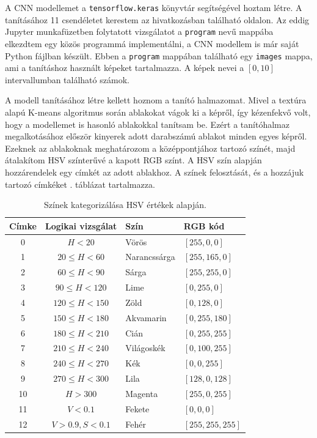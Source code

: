 
A CNN modellemet a \texttt{tensorflow.keras} könyvtár segítségével hoztam létre. A tanításához 11 csendéletet kerestem az \cite{unsplash} hivatkozásban található oldalon. Az eddig Jupyter munkafüzetben folytatott vizsgálatot a \texttt{program} nevű mappába elkezdtem egy közös programmá implementálni, a CNN modellem is már saját Python fájlban készült. Ebben a \texttt{program} mappában található egy \texttt{images} mappa, ami a tanításhoz használt képeket tartalmazza. A képek nevei a $[0, 10]$ intervallumban található számok.

A modell tanításához létre kellett hoznom a tanító halmazomat. Mivel a textúra alapú K-means algoritmus során ablakokat vágok ki a képről, így kézenfekvő volt, hogy a modellemet is hasonló ablakokkal tanítsam be. Ezért a tanítóhalmaz megalkotásához először kinyerek adott darabszámú ablakot minden egyes képről. Ezeknek az ablakoknak meghatározom a középpontjához tartozó színét, majd átalakítom HSV színterűvé a kapott RGB színt. A HSV szín alapján hozzárendelek egy címkét az adott ablakhoz. A színek felosztását, és a hozzájuk tartozó címkéket . táblázat tartalmazza.

\begin{table}[h]
\centering
\caption{Színek kategorizálása HSV értékek alapján.}
\label{tab:color_category}
\medskip
\begin{tabular}{|c|c|l|l|}
\hline
Címke & Logikai vizsgálat & Szín & RGB kód \\
\hline
0 & $H < 20$ & Vörös & $[255, 0, 0]$ \\
\hline
1 & $20 \leq H < 60$ & Narancssárga & $[255, 165, 0]$ \\
\hline
2 & $60 \leq H < 90$ & Sárga & $[255, 255, 0]$ \\
\hline
3 & $90 \leq H < 120$ & Lime & $[0, 255, 0]$ \\
\hline
4 & $120 \leq H < 150$ & Zöld & $[0, 128, 0]$ \\
\hline
5 & $150 \leq H < 180$ & Akvamarin & $[0, 255, 180]$ \\
\hline
6 & $180 \leq H < 210$ & Cián & $[0, 255, 255]$ \\
\hline
7 & $210 \leq H < 240$ & Világoskék & $[0, 100, 255]$ \\
\hline
8 & $240 \leq H < 270$ & Kék & $[0, 0, 255]$ \\
\hline
9 & $270 \leq H < 300$ & Lila & $[128, 0, 128]$ \\
\hline
10 & $H > 300$ & Magenta & $[255, 0, 255]$ \\
\hline
11 & $V < 0.1$ & Fekete & $[0, 0, 0]$ \\
\hline
12 & $V > 0.9, S < 0.1$ & Fehér & $[255, 255, 255]$\\
\hline
\end{tabular}

\end{table}

